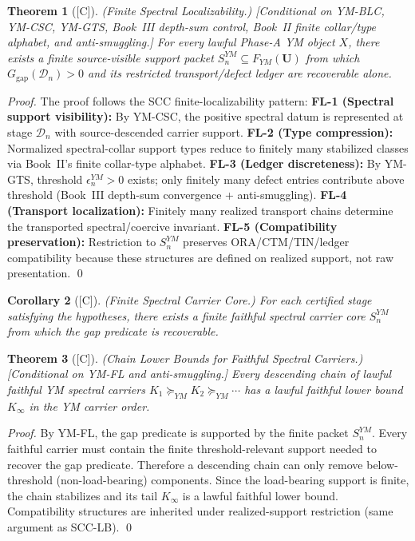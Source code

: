 \documentclass[12pt,oneside]{amsbook}
\theoremstyle{plain}
\newtheorem{theorem}{Theorem}[section]
\newtheorem{corollary}[theorem]{Corollary}
\theoremstyle{definition}
\theoremstyle{remark}
\newcommand{\status}[1]{\textup{[#1]}}
\begin{document}
\begin{theorem}[\status{C}]\label{thm:YM-FL}
\textup{(Finite Spectral Localizability.)}
\textup{[Conditional on YM-BLC, YM-CSC, YM-GTS, Book~III depth-sum
control, Book~II finite collar/type alphabet, and anti-smuggling.]}
For every lawful Phase-A YM object $X$, there exists a finite
source-visible support packet $S_n^{YM} \subseteq F_{YM}(\mathbf{U})$
from which $G_{\mathrm{gap}}(\mathcal{D}_n) > 0$ and its restricted
transport/defect ledger are recoverable alone.
\end{theorem}

\begin{proof}
The proof follows the SCC finite-localizability pattern:
\textbf{FL-1 (Spectral support visibility):} By YM-CSC, the positive
spectral datum is represented at stage $\mathcal{D}_n$ with
source-descended carrier support.
\textbf{FL-2 (Type compression):} Normalized spectral-collar support
types reduce to finitely many stabilized classes via Book~II's finite
collar-type alphabet.
\textbf{FL-3 (Ledger discreteness):} By YM-GTS, threshold
$\epsilon_n^{YM} > 0$ exists; only finitely many defect entries
contribute above threshold (Book~III depth-sum convergence + anti-smuggling).
\textbf{FL-4 (Transport localization):} Finitely many realized
transport chains determine the transported spectral/coercive invariant.
\textbf{FL-5 (Compatibility preservation):} Restriction to
$S_n^{YM}$ preserves ORA/CTM/TIN/ledger compatibility because these
structures are defined on realized support, not raw presentation.
\qed
\end{proof}

\begin{corollary}[\status{C}]\label{cor:YM-FL-core}
\textup{(Finite Spectral Carrier Core.)}
For each certified stage satisfying the hypotheses,
there exists a finite faithful spectral carrier core $S_n^{YM}$
from which the gap predicate is recoverable.
\end{corollary}

\begin{theorem}[\status{C}]\label{thm:YM-LB}
\textup{(Chain Lower Bounds for Faithful Spectral Carriers.)}
\textup{[Conditional on YM-FL and anti-smuggling.]}
Every descending chain of lawful faithful YM spectral carriers
$K_1 \succeq_{YM} K_2 \succeq_{YM} \cdots$
has a lawful faithful lower bound $K_\infty$ in the YM carrier order.
\end{theorem}

\begin{proof}
By YM-FL, the gap predicate is supported by the finite packet
$S_n^{YM}$. Every faithful carrier must contain the finite
threshold-relevant support needed to recover the gap predicate.
Therefore a descending chain can only remove below-threshold
(non-load-bearing) components. Since the load-bearing support is
finite, the chain stabilizes and its tail $K_\infty$ is a lawful
faithful lower bound. Compatibility structures are inherited under
realized-support restriction (same argument as SCC-LB).
\qed
\end{proof}
\end{document}
